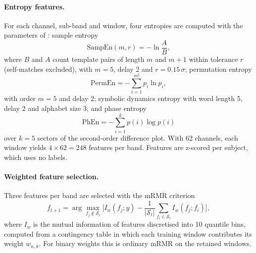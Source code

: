 \documentclass[11pt,a4paper]{article}
\begin{document}
\paragraph{Entropy features.} For each channel, sub-band and window, four entropies are computed with the parameters of \cite{FarhadiSedehi2024a}: sample entropy \cite{Richman2000}
\begin{equation}
\mathrm{SampEn}(m,r) = -\ln\frac{A}{B},
\end{equation}
where $B$ and $A$ count template pairs of length $m$ and $m+1$ within tolerance $r$ (self-matches excluded), with $m=5$, delay 2 and $r=0.15\,\sigma$; permutation entropy \cite{Bandt2002}
\begin{equation}
\mathrm{PermEn} = -\sum_{i=1}^{m!} p_i \ln p_i,
\end{equation}
with order $m=5$ and delay 2; symbolic dynamics entropy \cite{Zebrowski2000} with word length 5, delay 2 and alphabet size 3; and phase entropy \cite{Rohila2019}
\begin{equation}
\mathrm{PhEn} = -\sum_{i=1}^{k} p(i)\log p(i)
\end{equation}
over $k=5$ sectors of the second-order difference plot. With 62 channels, each window yields $4\times62=248$ features per band. Features are z-scored per subject, which uses no labels.

\paragraph{Weighted feature selection.} Three features per band are selected with the mRMR criterion \cite{Peng2005}
\begin{equation}
f_{t+1} = \arg\max_{f_j\notin\mathcal{S}_t}\Big[I_w(f_j;y) - \frac{1}{|\mathcal{S}_t|}\sum_{f_i\in\mathcal{S}_t} I_w(f_j;f_i)\Big],
\label{eq:mrmr}
\end{equation}
where $I_w$ is the mutual information of features discretised into 10 quantile bins, computed from a contingency table in which each training window contributes its weight $w_{n,k}$. For binary weights this is ordinary mRMR on the retained windows.
\end{document}
